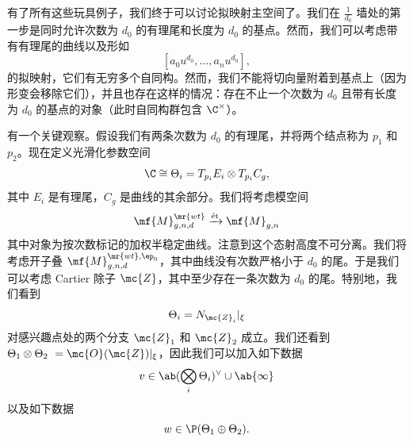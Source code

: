 有了所有这些玩具例子，我们终于可以讨论拟映射主空间了。我们在 \(\frac{1}{d_0}\) 墙处的第一步是同时允许次数为 \(d_0\) 的有理尾和长度为 \(d_0\) 的基点。然而，我们可以考虑带有有理尾的曲线以及形如
\[ [a_0 u^{d_0}, \ldots, a_n u^{d_0}], \]
的拟映射，它们有无穷多个自同构。然而，我们不能将切向量附着到基点上（因为形变会移除它们），并且也存在这样的情况：存在不止一个次数为 \(d_0\) 且带有长度为 \(d_0\) 的基点的对象（此时自同构群包含 \(\C^{\times}\)）。

\begin{rmk}
    有一个关键观察。假设我们有两条次数为 \(d_0\) 的有理尾，并将两个结点称为 \(p_1\) 和 \(p_2\)。现在定义光滑化参数空间
    \[ \C \cong \Theta_i = T_{p_i} E_i \otimes T_{p_i} C_g, \]
    其中 \(E_i\) 是有理尾，\(C_g\) 是曲线的其余部分。我们将考虑模空间
    \[ \mf{M}_{g,n,d}^{\mr{wt}} \xrightarrow{\text{\'et}} \mf{M}_{g,n} \]
    其中对象为按次数标记的加权半稳定曲线。注意到这个态射高度不可分离。我们将考虑开子叠 \(\mf{M}_{g,n,d}^{\mr{wt}, \ep_0}\)，其中曲线没有次数严格小于 \(d_0\) 的尾。于是我们可以考虑 Cartier 除子 \(\mc{Z}\)，其中至少存在一条次数为 \(d_0\) 的尾。特别地，我们看到
    \[ \Theta_i = N_{\mc{Z}_i} |_{\xi} \]
    对感兴趣点处的两个分支 \(\mc{Z}_1\) 和 \(\mc{Z}_2\) 成立。我们还看到 \(\Theta_1 \otimes \Theta_2\ = \mc{O}(\mc{Z})|_{\xi}\)，因此我们可以加入如下数据
    \[ v \in \ab(\bigotimes_i \Theta_i)^{\vee} \cup \ab\{\infty\} \]
    以及如下数据
    \[ w \in \P(\Theta_1 \oplus\Theta_2). \]
\end{rmk}

